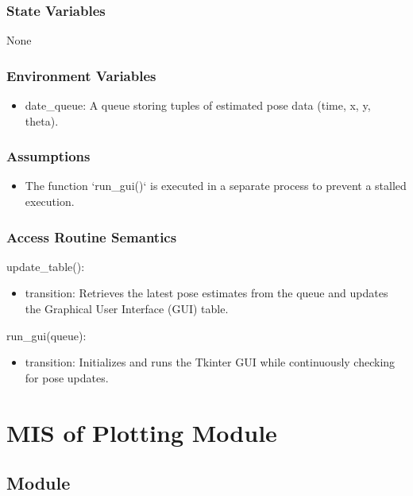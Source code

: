 \documentclass[12pt, titlepage]{article}
\begin{document}
\subsubsection{State Variables}
None
\subsubsection{Environment Variables}
\begin{itemize}
  \item date\_queue: A queue storing tuples of estimated pose data (time, x, y, theta).
\end{itemize}

\subsubsection{Assumptions}
\begin{itemize}
  \item The function `run\_gui()` is executed in a separate process to prevent a stalled execution.
\end{itemize}
\subsubsection{Access Routine Semantics}

\noindent update\_table():
\begin{itemize}
    \item transition: Retrieves the latest pose estimates from the queue and updates the Graphical User Interface (GUI) table.
\end{itemize}

\noindent run\_gui(queue):
\begin{itemize}
    \item transition: Initializes and runs the Tkinter GUI while continuously checking for pose updates.
\end{itemize}



\newpage

\section{MIS of Plotting Module} \label{M_Plotting}

\subsection{Module}
\end{document}
